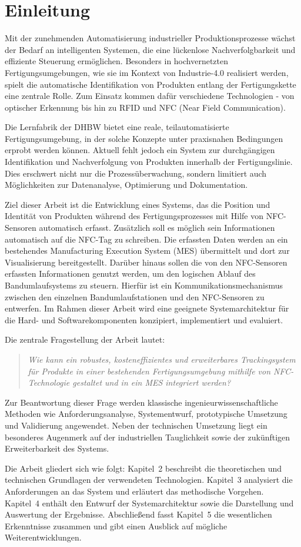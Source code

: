 \chapter{Einleitung}
\label{cha:Einleitung}

Mit der zunehmenden Automatisierung industrieller Produktionsprozesse wächst der Bedarf an intelligenten Systemen, die eine lückenlose Nachverfolgbarkeit und effiziente Steuerung ermöglichen.
Besonders in hochvernetzten Fertigungsumgebungen, wie sie im Kontext von Industrie-4.0 realisiert werden, spielt die automatische Identifikation von Produkten entlang der Fertigungskette eine zentrale Rolle. Zum Einsatz kommen dafür verschiedene Technologien - von optischer Erkennung bis hin zu RFID und NFC (Near Field Communication).

Die Lernfabrik der DHBW bietet eine reale, teilautomatisierte Fertigungsumgebung, in der solche Konzepte unter praxisnahen Bedingungen erprobt werden können. Aktuell fehlt jedoch ein System zur durchgängigen Identifikation und Nachverfolgung von Produkten innerhalb der Fertigungslinie. Dies erschwert nicht nur die Prozessüberwachung, sondern limitiert auch Möglichkeiten zur Datenanalyse, Optimierung und Dokumentation.

Ziel dieser Arbeit ist die Entwicklung eines Systems, das die Position und Identität von Produkten während des Fertigungsprozesses mit Hilfe von NFC-Sensoren automatisch erfasst. Zusätzlich soll es möglich sein Informationen automatisch auf die NFC-Tag zu schreiben. Die erfassten Daten werden an ein bestehendes Manufacturing Execution System (MES) übermittelt und dort zur Visualisierung bereitgestellt. Darüber hinaus sollen die von den NFC-Sensoren erfassten Informationen genutzt werden, um den logischen Ablauf des Bandumlaufsystems zu steuern. Hierfür ist ein Kommunikationsmechanismus zwischen den einzelnen Bandumlaufstationen und den NFC-Sensoren zu entwerfen. Im Rahmen dieser Arbeit wird eine geeignete Systemarchitektur für die Hard- und Softwarekomponenten konzipiert, implementiert und evaluiert.

Die zentrale Fragestellung der Arbeit lautet:
\begin{quote}
	\textit{Wie kann ein robustes, kosteneffizientes und erweiterbares Trackingsystem für Produkte in einer bestehenden Fertigungsumgebung mithilfe von NFC-Technologie gestaltet und in ein MES integriert werden?}
\end{quote}


Zur Beantwortung dieser Frage werden klassische ingenieurwissenschaftliche Methoden wie Anforderungsanalyse, Systementwurf, prototypische Umsetzung und Validierung angewendet. Neben der technischen Umsetzung liegt ein besonderes Augenmerk auf der industriellen Tauglichkeit sowie der zukünftigen Erweiterbarkeit des Systems.

Die Arbeit gliedert sich wie folgt:  
Kapitel~2 beschreibt die theoretischen und technischen Grundlagen der verwendeten Technologien. Kapitel~3 analysiert die Anforderungen an das System und erläutert das methodische Vorgehen. Kapitel~4 enthält den Entwurf der Systemarchitektur sowie die Darstellung und Auswertung der Ergebnisse. Abschließend fasst Kapitel~5 die wesentlichen Erkenntnisse zusammen und gibt einen Ausblick auf mögliche Weiterentwicklungen.
